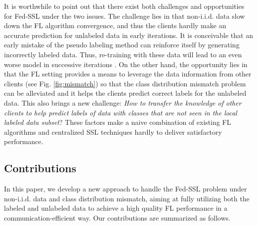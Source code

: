 \documentclass[twoside,journal]{IEEEtran}
\begin{document}
It is worthwhile to point out that there exist both challenges and opportunities for Fed-SSL under the two issues. The challenge lies in that non-i.i.d. data slow down the FL algorithm convergence, and thus the clients hardly make an accurate prediction for unlabeled data in early iterations.  It is conceivable that an early mistake of the pseudo labeling method can reinforce itself by generating incorrectly labeled data. Thus, re-training with these data will lead to an even worse model in successive iterations \cite{zhu2005}. On the other hand, the  opportunity lies in that the FL setting provides a means to leverage the data information from other clients (see Fig. \ref{fig:mismatch}) so that the class distribution mismatch problem can be alleviated and it helps the clients predict correct labels for the unlabeled data. This also brings a new challenge: \emph{How to transfer the knowledge of other clients to help predict labels
of data with classes that are not seen in the local labeled data subset}? These factors  make a naive combination of existing FL algorithms and centralized SSL techniques hardly
 to  deliver satisfactory performance.




\vspace{-0.3cm}
\subsection{Contributions}
In this paper, we develop a new approach to handle the Fed-SSL problem under non-i.i.d. data and class
distribution mismatch, aiming at  fully utilizing both the labeled and unlabeled data to achieve a high quality
FL performance in a communication-efficient way. Our contributions are summarized as follows.


\end{document}
